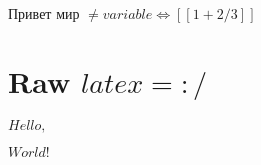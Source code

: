 
\(\text{Привет }\allowbreak\text{мир }\allowbreak\neq variable \Leftrightarrow [[1 + 2 / 3]]\)

\section{Raw $latex = :/$}


\(Hello, \)\( World!\)



